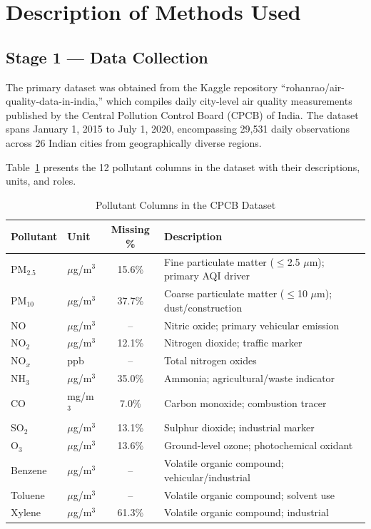 \documentclass[12pt,a4paper]{report}
\begin{document}
\section{Description of Methods Used}\label{idx:s41}

\subsection{Stage 1 --- Data Collection}

The primary dataset was obtained from the Kaggle repository ``rohanrao/air-quality-data-in-india,'' which compiles daily city-level air quality measurements published by the Central Pollution Control Board (CPCB) of India. The dataset spans January 1, 2015 to July 1, 2020, encompassing 29,531 daily observations across 26 Indian cities from geographically diverse regions.

Table~\ref{tab:pollutants} presents the 12 pollutant columns in the dataset with their descriptions, units, and roles.

\begin{table}[H]
\centering
\caption{Pollutant Columns in the CPCB Dataset}
\label{tab:pollutants}
\small
\begin{tabular}{|l|l|c|p{6cm}|}
\hline
\textbf{Pollutant} & \textbf{Unit} & \textbf{Missing \%} & \textbf{Description} \\
\hline
PM$_{2.5}$ & $\mu$g/m$^3$ & 15.6\% & Fine particulate matter ($\leq$2.5 $\mu$m); primary AQI driver \\
\hline
PM$_{10}$ & $\mu$g/m$^3$ & 37.7\% & Coarse particulate matter ($\leq$10 $\mu$m); dust/construction \\
\hline
NO & $\mu$g/m$^3$ & -- & Nitric oxide; primary vehicular emission \\
\hline
NO$_2$ & $\mu$g/m$^3$ & 12.1\% & Nitrogen dioxide; traffic marker \\
\hline
NO$_x$ & ppb & -- & Total nitrogen oxides \\
\hline
NH$_3$ & $\mu$g/m$^3$ & 35.0\% & Ammonia; agricultural/waste indicator \\
\hline
CO & mg/m$^3$ & 7.0\% & Carbon monoxide; combustion tracer \\
\hline
SO$_2$ & $\mu$g/m$^3$ & 13.1\% & Sulphur dioxide; industrial marker \\
\hline
O$_3$ & $\mu$g/m$^3$ & 13.6\% & Ground-level ozone; photochemical oxidant \\
\hline
Benzene & $\mu$g/m$^3$ & -- & Volatile organic compound; vehicular/industrial \\
\hline
Toluene & $\mu$g/m$^3$ & -- & Volatile organic compound; solvent use \\
\hline
Xylene & $\mu$g/m$^3$ & 61.3\% & Volatile organic compound; industrial \\
\hline
\end{tabular}
\end{table}
\end{document}
